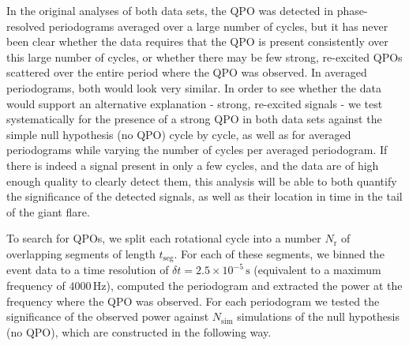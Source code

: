 \documentclass{emulateapj}
\begin{document}
In the original analyses of both data sets, the QPO was detected in phase-resolved periodograms averaged over a large number of cycles, but it has never been clear whether the data requires that the QPO is present consistently over this large number of cycles, or whether there may be few strong, re-excited QPOs scattered over the entire period where the QPO was observed. In averaged periodograms, both would look very similar.
In order to see whether the data would support an alternative explanation - strong, re-excited signals - we test systematically for the presence of a strong QPO in both data sets against the simple null hypothesis (no QPO) cycle by cycle, as well as for averaged periodograms while varying the number of cycles per averaged periodogram. If there is indeed a signal present in only a few cycles, and the data are of high enough quality to clearly detect them, this analysis will be able to both quantify the significance of the detected signals, as well as their location in time in the tail of the giant flare.

To search for QPOs, we split each rotational cycle into a number $N_\mathrm{r}$ of overlapping segments of length $t_{\mathrm{seg}}$. For each of these segments, we binned the event data to a time resolution of $\delta t = 2.5 \times 10^{-5} \, \mathrm{s}$ (equivalent to a maximum frequency of $4000 \, \mathrm{Hz}$), computed the periodogram and extracted the power at the frequency where the QPO was observed. For each periodogram we tested the significance of the observed power against $N_{\mathrm{sim}}$ simulations of the null hypothesis (no QPO), which are constructed in the following way.
\end{document}
